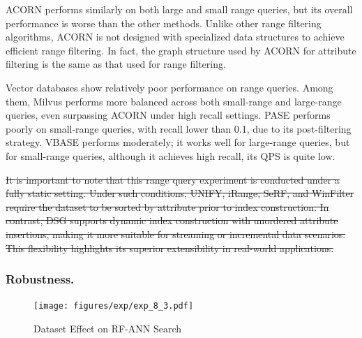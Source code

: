 \documentclass[sigconf, nonacm]{acmart}
\begin{document}
	ACORN performs similarly on both large and small range queries, but its overall performance is worse than the other methods. Unlike other range filtering algorithms, ACORN is not designed with specialized data structures  to achieve efficient range filtering. In fact, the graph structure used by ACORN for attribute filtering is the same as that used for range filtering.
	
	
	Vector databases  show relatively poor performance on range queries. Among them, Milvus performs more balanced across both small-range and large-range queries, even surpassing ACORN under high recall settings. PASE performs poorly on small-range queries, with recall lower than 0.1, due to its post-filtering strategy. 
	VBASE performs moderately; it works well for large-range queries, but for small-range queries, although it achieves high recall, its QPS is quite  low.
	
	
	
	\sout{It is important to note that this range query experiment is conducted under a fully static setting. Under such conditions, UNIFY, iRange, SeRF, and WinFilter require the dataset to be sorted by attribute prior to index construction. In contrast, DSG  supports dynamic index construction with unordered attribute insertions, making it more suitable for streaming or incremental data scenarios. This flexibility highlights its superior extensibility in real-world applications.}
	
	\subsubsection{Robustness.}
	
	
	\begin{figure}[htbp]
		\centering
		\texttt{[image: figures/exp/exp\_8\_3.pdf]}
		\caption{Dataset Effect on RF-ANN Search}
		\label{fig:exp_8_3}
	\end{figure}
	
\end{document}
